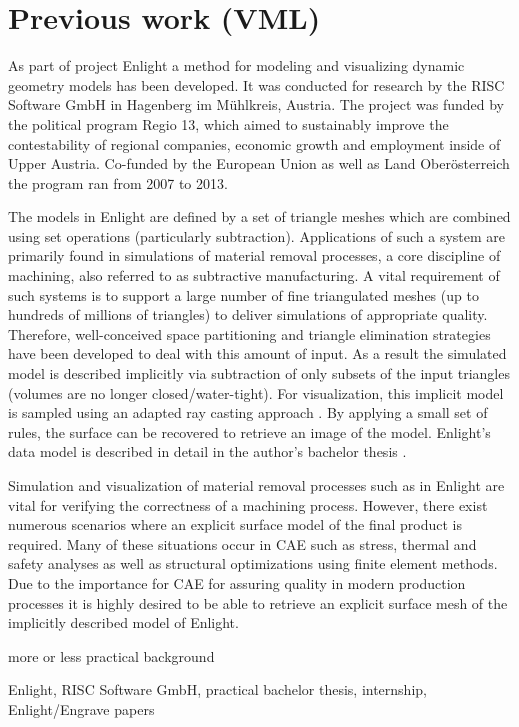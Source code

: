 \chapter{Previous work (VML)}
\label{ch:previous_work}

As part of project Enlight a method for modeling and visualizing dynamic geometry models has been developed.
It was conducted for research by the RISC Software GmbH in Hagenberg im M\"uhlkreis, Austria.
The project was funded by the political program Regio 13, which aimed to sustainably improve the contestability of regional companies, economic growth and employment inside of Upper Austria.
Co-funded by the European Union as well as Land Ober\"osterreich the program ran from 2007 to 2013.

The models in Enlight are defined by a set of triangle meshes which are combined using set operations (particularly subtraction).
Applications of such a system are primarily found in simulations of material removal processes, a core discipline of machining, also referred to as subtractive manufacturing.
A vital requirement of such systems is to support a large number of fine triangulated meshes (up to hundreds of millions of triangles) to deliver simulations of appropriate quality.
Therefore, well-conceived space partitioning and triangle elimination strategies have been developed to deal with this amount of input.
As a result the simulated model is described implicitly via subtraction of only subsets of the input triangles (volumes are no longer closed/water-tight).
For visualization, this implicit model is sampled using an adapted ray casting approach \cite{enlight}.
By applying a small set of rules, the surface can be recovered to retrieve an image of the model.
Enlight's data model is described in detail in the author's bachelor thesis \cite{bachelor}.

Simulation and visualization of material removal processes such as in Enlight are vital for verifying the correctness of a machining process.
However, there exist numerous scenarios where an explicit surface model of the final product is required.
Many of these situations occur in CAE such as stress, thermal and safety analyses as well as structural optimizations using finite element methods.
Due to the importance for CAE for assuring quality in modern production processes it is highly desired to be able to retrieve an explicit surface mesh of the implicitly described model of Enlight.



more or less practical background

Enlight, RISC Software GmbH, practical bachelor thesis, internship, Enlight/Engrave papers
